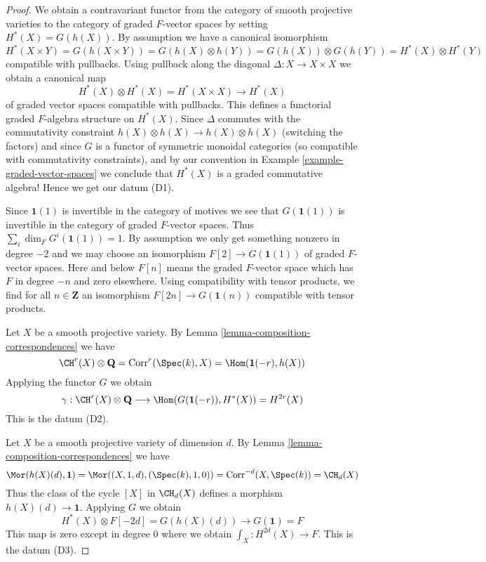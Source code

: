 \begin{proof}
We obtain a contravariant functor from the category of smooth
projective varieties to the category of graded $F$-vector spaces
by setting $H^*(X) = G(h(X))$. By assumption we have a canonical
isomorphism
$$
H^*(X \times Y) = G(h(X \times Y)) = G(h(X) \otimes h(Y)) =
G(h(X)) \otimes G(h(Y)) = H^*(X) \otimes H^*(Y)
$$
compatible with pullbacks. Using pullback along the diagonal
$\Delta : X \to X \times X$ we obtain a canonical map
$$
H^*(X) \otimes H^*(X) = H^*(X \times X) \to H^*(X)
$$
of graded vector spaces compatible with pullbacks.
This defines a functorial graded $F$-algebra structure on
$H^*(X)$. Since $\Delta$ commutes with the commutativity
constraint $h(X) \otimes h(X) \to h(X) \otimes h(X)$ (switching the factors)
and since $G$ is a functor of symmetric monoidal categories (so compatible with
commutativity constraints), and by our convention in
Example \ref{example-graded-vector-spaces}
we conclude that $H^*(X)$ is a graded
commutative algebra! Hence we get our datum (D1).

\medskip\noindent
Since $\mathbf{1}(1)$ is invertible in the category of motives
we see that $G(\mathbf{1}(1))$ is invertible in the category of
graded $F$-vector spaces. Thus $\sum_i \dim_F G^i(\mathbf{1}(1)) = 1$.
By assumption we only get something nonzero in degree $-2$ and we may
choose an isomorphism $F[2] \to G(\mathbf{1}(1))$ of graded $F$-vector spaces.
Here and below $F[n]$ means the graded $F$-vector space which has
$F$ in degree $-n$ and zero elsewhere. Using compatibility with
tensor products, we find for all $n \in \mathbf{Z}$ an isomorphism
$F[2n] \to G(\mathbf{1}(n))$ compatible with tensor products.

\medskip\noindent
Let $X$ be a smooth projective variety. By
Lemma \ref{lemma-composition-correspondences} we have
$$
\CH^r(X) \otimes \mathbf{Q} = \text{Corr}^r(\Spec(k), X) =
\Hom(\mathbf{1}(-r), h(X))
$$
Applying the functor $G$ we obtain
$$
\gamma :
\CH^r(X) \otimes \mathbf{Q} \longrightarrow
\Hom(G(\mathbf{1}(-r)), H^*(X)) = H^{2r}(X)
$$
This is the datum (D2).

\medskip\noindent
Let $X$ be a smooth projective variety of dimension $d$. By
Lemma \ref{lemma-composition-correspondences} we have
$$
\Mor(h(X)(d), \mathbf{1}) = \Mor((X, 1, d), (\Spec(k), 1, 0)) =
\text{Corr}^{-d}(X, \Spec(k)) = \CH_d(X)
$$
Thus the class of the cycle $[X]$ in $\CH_d(X)$ defines a morphism
$h(X)(d) \to \mathbf{1}$. Applying $G$ we obtain
$$
H^*(X) \otimes F[-2d] = G(h(X)(d)) \longrightarrow G(\mathbf{1}) = F
$$
This map is zero except in degree $0$ where we obtain
$\int_X : H^{2d}(X) \to F$. This is the datum (D3).


\end{proof}
